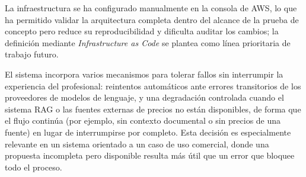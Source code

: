 La infraestructura se ha configurado manualmente en la consola de AWS, lo que ha
permitido validar la arquitectura completa dentro del alcance de la prueba de concepto
pero reduce su reproducibilidad y dificulta auditar los cambios; la definición mediante
\textit{Infrastructure as Code} se plantea como línea prioritaria de trabajo futuro.

El sistema incorpora varios mecanismos para tolerar fallos sin interrumpir la experiencia del profesional: reintentos automáticos ante errores transitorios de los proveedores de modelos de lenguaje, y una degradación controlada cuando el sistema RAG o las fuentes externas de precios no están disponibles, de forma que el flujo continúa (por ejemplo, sin contexto documental o sin precios de una fuente) en lugar de interrumpirse por completo. Esta decisión es especialmente relevante en un sistema orientado a un caso de uso comercial, donde una propuesta incompleta pero disponible resulta más útil que un error que bloquee todo el proceso.
